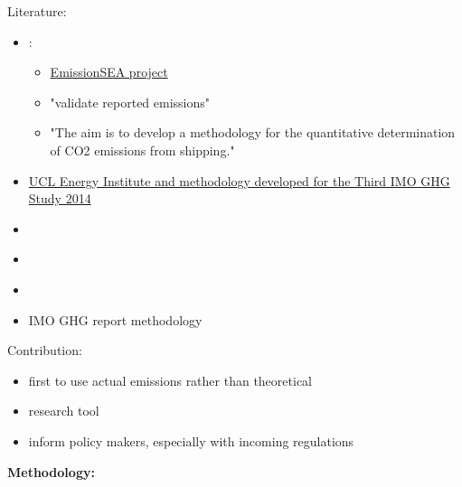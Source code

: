 \documentclass[12pt,letterpaper]{article}
\begin{document}
Literature:
\begin{itemize}
  \item \citet{uge2020estimation}: 
  \begin{itemize}
    \item \href{https://research.fleetmon.com/projects/emissionsea-extrapolation-of-emissions-from-ships/}{EmissionSEA project}
    \item "validate reported emissions"
    \item "The aim is to develop a methodology for the quantitative determination of CO2 emissions from shipping."
  \end{itemize}
  \item \href{https://www.ucl.ac.uk/bartlett/energy/news/2016/apr/co2-emissions-every-ship-every-hour-now-thats-big-data}{UCL Energy Institute and methodology developed for the Third IMO GHG Study 2014}  
  \item \citet{johansson2017global}
  \item \citet{jalkanen2009modelling}
  \item \citet{van2018spatially}
  \item \citet[2.2]{faber2020fourth} IMO GHG report methodology
\end{itemize}


Contribution:
\begin{itemize}
  \item first to use actual emissions rather than theoretical
  \item research tool
  \item inform policy makers, especially with incoming regulations
\end{itemize}

\smallskip 

\noindent \textbf{Methodology:}  

\end{document}
